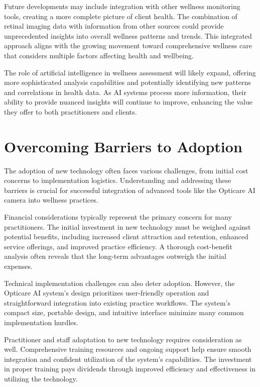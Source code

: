 \documentclass[
  Letterpaper,
]{scrbook}
\begin{document}
Future developments may include integration with other wellness
monitoring tools, creating a more complete picture of client health. The
combination of retinal imaging data with information from other sources
could provide unprecedented insights into overall wellness patterns and
trends. This integrated approach aligns with the growing movement toward
comprehensive wellness care that considers multiple factors affecting
health and wellbeing.

The role of artificial intelligence in wellness assessment will likely
expand, offering more sophisticated analysis capabilities and
potentially identifying new patterns and correlations in health data. As
AI systems process more information, their ability to provide nuanced
insights will continue to improve, enhancing the value they offer to
both practitioners and clients.

\section{Overcoming Barriers to
Adoption}\label{overcoming-barriers-to-adoption}

The adoption of new technology often faces various challenges, from
initial cost concerns to implementation logistics. Understanding and
addressing these barriers is crucial for successful integration of
advanced tools like the Opticare AI camera into wellness practices.

Financial considerations typically represent the primary concern for
many practitioners. The initial investment in new technology must be
weighed against potential benefits, including increased client
attraction and retention, enhanced service offerings, and improved
practice efficiency. A thorough cost-benefit analysis often reveals that
the long-term advantages outweigh the initial expenses.

Technical implementation challenges can also deter adoption. However,
the Opticare AI system's design prioritizes user-friendly operation and
straightforward integration into existing practice workflows. The
system's compact size, portable design, and intuitive interface minimize
many common implementation hurdles.

Practitioner and staff adaptation to new technology requires
consideration as well. Comprehensive training resources and ongoing
support help ensure smooth integration and confident utilization of the
system's capabilities. The investment in proper training pays dividends
through improved efficiency and effectiveness in utilizing the
technology.
\end{document}
